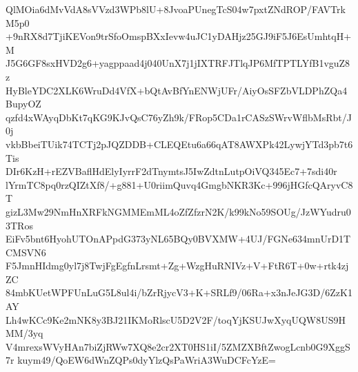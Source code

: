 QlMOia6dMvVdA8sVVzd3WPb8lU+8JvoaPUnegTcS04w7pxtZNdROP/FAVTrkM5p0
+9nRX8d7TjiKEVon9trSfoOmspBXxIevw4uJC1yDAHjz25GJ9iF5J6EsUmhtqH+M
J5G6GF8sxHVD2g6+yagppaad4j040UnX7j1jIXTRFJTlqJP6MfTPTLYfB1vguZ8z
HyBleYDC2XLK6WruDd4VfX+bQtAvBfYnENWjUFr/AiyOsSFZbVLDPhZQa4BupyOZ
qzfd4xWAyqDbKt7qKG9KJvQsC76yZh9k/FRop5CDa1rCASzSWrvWflbMsRbt/J0j
vkbBbeiTUik74TCTj2pJQZDDB+CLEQEtu6a66qAT8AWXPk42LywjYTd3pb7t6Tis
DIr6KzH+rEZVBaflHdElyIyrrF2dTnymtsJ5IwZdtnLutpOiVQ345Ec7+7sdi40r
lYrmTC8pq0rzQIZtXf8/+g881+U0riimQuvq4GmgbNKR3Kc+996jHGfcQAryvC8T
gizL3Mw29NmHnXRFkNGMMEmML4oZfZfzrN2K/k99kNo59SOUg/JzWYudru03TRos
EiFv5bnt6HyohUTOnAPpdG373yNL65BQy0BVXMW+4UJ/FGNe634mnUrD1TCMSVN6
F5JmnHIdmg0yl7j8TwjFgEgfnLrsmt+Zg+WzgHuRNIVz+V+FtR6T+0w+rtk4zjZC
84mbKUetWPFUnLuG5L8ul4i/bZrRjycV3+K+SRLf9/06Ra+x3nJeJG3D/6ZzK1AY
Lh4wKCc9Ke2mNK8y3BJ21IKMoRlscU5D2V2F/toqYjKSUJwXyqUQW8US9HMM/3yq
V4mrexsWVyHAn7biZjRWw7XQ8e2cr2XT0HS1iI/5ZMZXBftZwogLcnb0G9XggS7r
kuym49/QoEW6dWnZQPs0dyYlzQsPaWriA3WuDCFcYzE=

